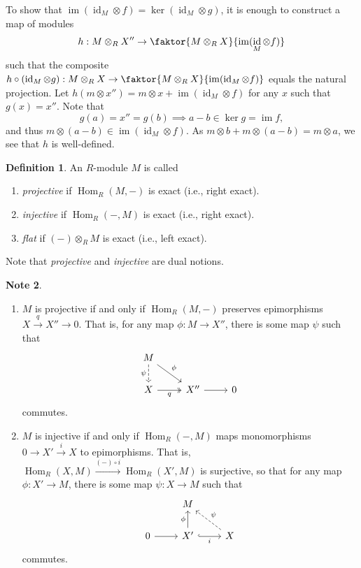 \documentclass[10pt,letterpaper,cm]{nupset}
\theoremstyle{definition}
\newtheorem{definition}{Definition}[subsection]
\newtheorem{note}[definition]{Note}
\theoremstyle{theorem}
\theoremstyle{remark}
\newcommand{\1}{\mathbf{1}}
\newcommand{\0}{\vec 0}
\DeclareMathOperator{\id}{\mathrm{id}}
\DeclareMathOperator{\im}{im}
\DeclareMathOperator{\Hom}{Hom}
\begin{document}
To show that $\im(\id_M \otimes f) = \ker(\id_M \otimes g)$, it is enough to construct a map of modules $$h: M \otimes_R X'' \to \faktor{M \otimes_R X}{\im(\id_M \otimes f)}$$ such that the composite $h\circ \left(\id_M \otimes g\right) : M\otimes_R X \to \faktor{M \otimes_R X}{\im(\id_M \otimes f)}$ equals the natural projection. Let $h(m\otimes x'') = m \otimes x + \im(\id_M \otimes f)$ for any $x$ such that $g(x) = x''$. Note that $$g(a) = x'' = g(b) \implies a-b \in \ker{g} = \im{f},$$ and thus $m \otimes (a-b) \in \im(\id_M \otimes f)$. As $m\otimes b + m \otimes (a-b) = m\otimes a$, we see that $h$ is well-defined.

\smallskip

\begin{definition} An $R$-module $M$ is called
\begin{enumerate}
\item \textit{projective} if $\Hom_R(M, -)$ is exact (i.e., right exact).
\item \textit{injective} if $\Hom_R(-, M)$ is exact (i.e., right exact).
\item \textit{flat} if $\left({-}\right) \otimes_R M$ is exact (i.e., left exact).
\end{enumerate}
\end{definition}


Note that \textit{projective} and \textit{injective} are dual notions.


\begin{note} $ $
\begin{enumerate}
\item $M$ is projective  if and only if $\Hom_R(M, -)$ preserves epimorphisms $X \overset{q}{\longrightarrow}  X'' \to 0$. That is, for any map $\phi : M \to X''$, there is some map $\psi$ such that
\[
\begin{tikzcd}
M \arrow[rd, "\phi"] \arrow[d, "\psi"', dashed] &  &  \\
X \arrow[r, "q"', two heads] & X'' \arrow[r] & 0
\end{tikzcd}
\] commutes.
\item $M$ is injective  if and only if $\Hom_R(-, M)$ maps monomorphisms $0\to X' \overset{i}{\longrightarrow} X$ to epimorphisms. That is, $\Hom_R(X, M) \overset{(-) \circ i}{\longrightarrow} \Hom_R(X', M)$ is surjective, so that for any map $\phi : X' \to M$, there is some map $\psi : X \to M$ such that 
\[
\begin{tikzcd}
 & M &  \\
0 \arrow[r] & X' \arrow[r, "i"', hook] \arrow[u, "\phi"] & X \arrow[lu, "\psi"', dashed]
\end{tikzcd}
\] commutes.
\end{enumerate}
\end{note}
\end{document}
